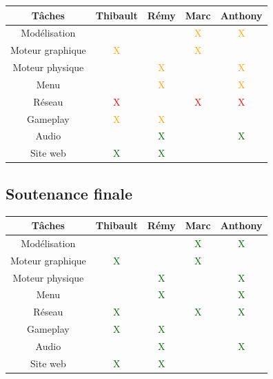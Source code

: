 \documentclass[a4paper, 11pt]{report}
\begin{document}
\begin{tabular}{ | c || c | c | c | c | }
\hline Tâches & Thibault & Rémy & Marc & Anthony \\
\hline Modélisation & & & \textcolor{orange}{X} & \textcolor{orange}{X} \\
\hline Moteur graphique & \textcolor{orange}{X} & & \textcolor{orange}{X} & \\
\hline Moteur physique & & \textcolor{orange}{X} & & \textcolor{orange}{X} \\
\hline Menu & & \textcolor{orange}{X} & & \textcolor{orange}{X} \\
\hline Réseau & \textcolor{red}{X} & & \textcolor{red}{X} & \textcolor{red}{X} \\
\hline Gameplay & \textcolor{orange}{X} & \textcolor{orange}{X} & & \\
\hline Audio & & \textcolor{darkgreen}{X} & & \textcolor{darkgreen}{X} \\
\hline Site web & \textcolor{darkgreen}{X} & \textcolor{darkgreen}{X} & & \\
\hline
\end{tabular}

\subsection{Soutenance finale}\label{soutenance-finale}

\begin{tabular}{ | c || c | c | c | c | }
\hline Tâches & Thibault & Rémy & Marc & Anthony \\
\hline Modélisation & & & \textcolor{darkgreen}{X} & \textcolor{darkgreen}{X} \\
\hline Moteur graphique & \textcolor{darkgreen}{X} & & \textcolor{darkgreen}{X} & \\
\hline Moteur physique & & \textcolor{darkgreen}{X} & & \textcolor{darkgreen}{X} \\
\hline Menu & & \textcolor{darkgreen}{X} & & \textcolor{darkgreen}{X} \\
\hline Réseau & \textcolor{darkgreen}{X} & & \textcolor{darkgreen}{X} & \textcolor{darkgreen}{X} \\
\hline Gameplay & \textcolor{darkgreen}{X} & \textcolor{darkgreen}{X} & & \\
\hline Audio & & \textcolor{darkgreen}{X} & & \textcolor{darkgreen}{X} \\
\hline Site web & \textcolor{darkgreen}{X} & \textcolor{darkgreen}{X} & & \\
\hline
\end{tabular}
\end{document}
